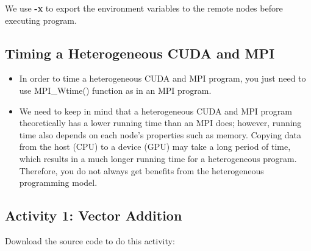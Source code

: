 \documentclass[letterpaper,10pt,openany,oneside]{sphinxmanual}
\begin{document}
We use \textbf{-x} to export the environment variables to the remote nodes before executing program.


\subsection{Timing a Heterogeneous CUDA and MPI}
\label{CodingAndCompiling/CodingAndCompiling:timing-a-heterogeneous-cuda-and-mpi}\begin{itemize}
\item {} 
In order to time a heterogeneous CUDA and MPI program, you just need to use MPI\_Wtime() function as in an MPI program.

\item {} 
We need to keep in mind that a heterogeneous CUDA and MPI program theoretically has a lower running time than an MPI does; however, running time also depends on each node's properties such as memory. Copying data from the host (CPU) to a device (GPU) may take a long period of time, which results in a much longer running time for a heterogeneous program. Therefore, you do not always get benefits from the heterogeneous programming model.

\end{itemize}


\subsection{Activity 1: Vector Addition}
\label{CodingAndCompiling/CodingAndCompiling:activity-1-vector-addition}\begin{description}
\item[{Download the source code to do this activity:}] \leavevmode
{}


\end{description}
\end{document}
